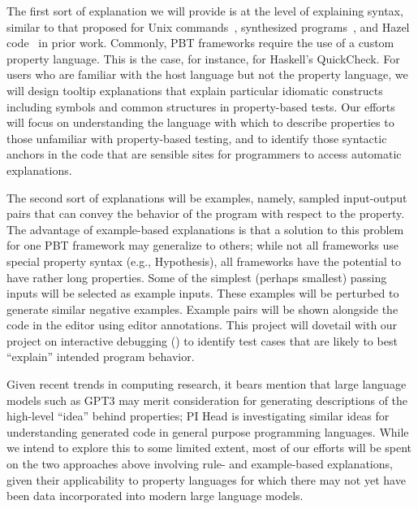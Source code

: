The first sort of explanation we will provide is at the level of explaining
syntax, similar to that proposed for Unix commands~\cite{ref:head2015tutorons},
synthesized programs~\cite{ref:mayer2015user}, and Hazel
code~\cite{ref:potter2022contextualized} in prior work. Commonly, PBT frameworks
require the use of a custom property language. This is the case, for instance,
for Haskell's QuickCheck. For users who are familiar with the host language but
not the property language, we will design tooltip explanations that explain
particular idiomatic constructs including symbols and common structures in
property-based tests. Our efforts will focus on understanding the language with
which to describe properties to those unfamiliar with property-based testing,
and to identify those syntactic anchors in the code that are sensible sites for
programmers to access automatic explanations.

The second sort of explanations will be examples, namely, sampled input-output
pairs that can convey the behavior of the program with respect to the property.
The advantage of example-based explanations is that a solution to this problem
for one PBT framework may generalize to others; while not all frameworks use
special property syntax (e.g., Hypothesis), all frameworks have the potential to
have rather long properties. Some of the simplest (perhaps smallest) passing
inputs will be selected as example inputs. These examples will be perturbed to
generate similar negative examples. Example pairs will be shown alongside the
code in the editor using editor annotations. This project will dovetail with our
project on interactive debugging () to identify
test cases that are likely to best ``explain'' intended program behavior.

Given recent trends in computing research, it bears mention that large language
models such as GPT3 may merit consideration for generating descriptions of the
high-level ``idea'' behind properties; PI Head is investigating similar ideas
for understanding generated code in general purpose programming languages. While
we intend to explore this to some limited extent, most of our efforts will be
spent on the two approaches above involving rule- and example-based
explanations, given their applicability to property languages for which there
may not yet have been data incorporated into modern large language models.

\iflater{}\fi


